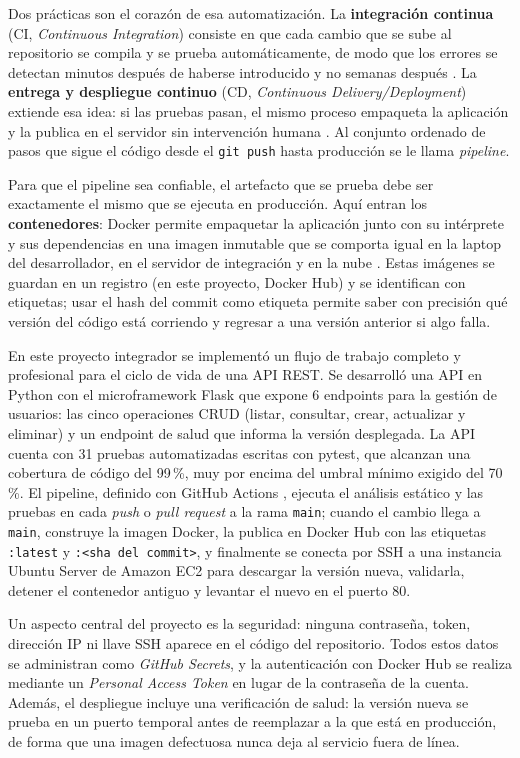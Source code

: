 \documentclass[12pt,letterpaper]{article}
\begin{document}
Dos prácticas son el corazón de esa automatización. La \textbf{integración continua} (CI,
\textit{Continuous Integration}) consiste en que cada cambio que se sube al repositorio se
compila y se prueba automáticamente, de modo que los errores se detectan minutos después de
haberse introducido y no semanas después \cite{fowler2006}. La \textbf{entrega y despliegue
continuo} (CD, \textit{Continuous Delivery/Deployment}) extiende esa idea: si las pruebas pasan,
el mismo proceso empaqueta la aplicación y la publica en el servidor sin intervención humana
\cite{humble2010}. Al conjunto ordenado de pasos que sigue el código desde el \texttt{git push}
hasta producción se le llama \textit{pipeline}.

Para que el pipeline sea confiable, el artefacto que se prueba debe ser exactamente el mismo que
se ejecuta en producción. Aquí entran los \textbf{contenedores}: Docker permite empaquetar la
aplicación junto con su intérprete y sus dependencias en una imagen inmutable que se comporta igual
en la laptop del desarrollador, en el servidor de integración y en la nube \cite{dockerdocs}.
Estas imágenes se guardan en un registro (en este proyecto, Docker Hub) y se identifican con
etiquetas; usar el hash del commit como etiqueta permite saber con precisión qué versión del código
está corriendo y regresar a una versión anterior si algo falla.

En este proyecto integrador se implementó un flujo de trabajo completo y profesional para el ciclo
de vida de una API REST. Se desarrolló una API en Python con el microframework Flask
\cite{flaskdocs} que expone 6 endpoints para la gestión de usuarios: las cinco operaciones
CRUD (listar, consultar, crear, actualizar y eliminar) y un endpoint de salud que informa la
versión desplegada. La API cuenta con 31 pruebas automatizadas escritas con pytest, que alcanzan una
cobertura de código del 99\,\%, muy por encima del umbral mínimo exigido del 70\,\%. El pipeline,
definido con GitHub Actions \cite{githubactions}, ejecuta el análisis estático y las pruebas en cada
\textit{push} o \textit{pull request} a la rama \texttt{main}; cuando el cambio llega a
\texttt{main}, construye la imagen Docker, la publica en Docker Hub con las etiquetas
\texttt{:latest} y \texttt{:<sha del commit>}, y finalmente se conecta por SSH a una instancia
Ubuntu Server de Amazon EC2 \cite{awsec2} para descargar la versión nueva, validarla, detener el
contenedor antiguo y levantar el nuevo en el puerto 80.

Un aspecto central del proyecto es la seguridad: ninguna contraseña, token, dirección IP ni llave
SSH aparece en el código del repositorio. Todos estos datos se administran como
\textit{GitHub Secrets}, y la autenticación con Docker Hub se realiza mediante un
\textit{Personal Access Token} en lugar de la contraseña de la cuenta. Además, el despliegue
incluye una verificación de salud: la versión nueva se prueba en un puerto temporal antes de
reemplazar a la que está en producción, de forma que una imagen defectuosa nunca deja al servicio
fuera de línea.
\end{document}
